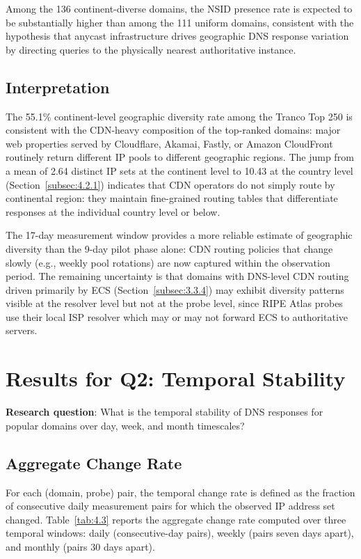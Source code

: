 Among the 136 continent-diverse domains, the NSID presence rate is expected to be substantially higher than among the 111 uniform domains, consistent with the hypothesis that anycast infrastructure drives geographic DNS response variation by directing queries to the physically nearest authoritative instance.

\subsection{Interpretation}
\label{subsec:4.2.3}

The 55.1\% continent-level geographic diversity rate among the Tranco Top 250 is consistent with the CDN-heavy composition of the top-ranked domains: major web properties served by Cloudflare, Akamai, Fastly, or Amazon CloudFront routinely return different IP pools to different geographic regions. The jump from a mean of 2.64 distinct IP sets at the continent level to 10.43 at the country level (Section~\ref{subsec:4.2.1}) indicates that CDN operators do not simply route by continental region: they maintain fine-grained routing tables that differentiate responses at the individual country level or below.

The 17-day measurement window provides a more reliable estimate of geographic diversity than the 9-day pilot phase alone: CDN routing policies that change slowly (e.g., weekly pool rotations) are now captured within the observation period. The remaining uncertainty is that domains with DNS-level CDN routing driven primarily by ECS (Section~\ref{subsec:3.3.4}) may exhibit diversity patterns visible at the resolver level but not at the probe level, since RIPE Atlas probes use their local ISP resolver which may or may not forward ECS to authoritative servers.

\bigskip
\section{Results for Q2: Temporal Stability}
\label{sec:4.3}

\textbf{Research question}: What is the temporal stability of DNS responses for popular domains over day, week, and month timescales?

\subsection{Aggregate Change Rate}
\label{subsec:4.3.1}

For each (domain, probe) pair, the temporal change rate is defined as the fraction of consecutive daily measurement pairs for which the observed IP address set changed. Table~\ref{tab:4.3} reports the aggregate change rate computed over three temporal windows: daily (consecutive-day pairs), weekly (pairs seven days apart), and monthly (pairs 30 days apart).

